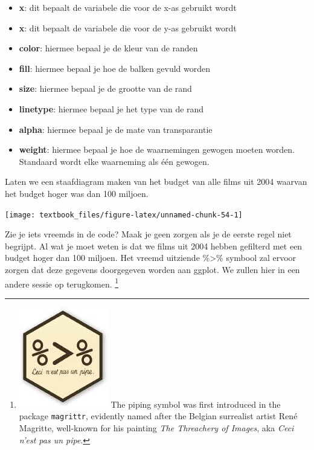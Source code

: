 \documentclass[]{tufte-book}
\newenvironment{Shaded}{}{}
\newcommand{\DecValTok}[1]{\textcolor[rgb]{0.25,0.63,0.44}{#1}}
\newcommand{\KeywordTok}[1]{\textcolor[rgb]{0.00,0.44,0.13}{\textbf{#1}}}
\newcommand{\NormalTok}[1]{#1}
\newcommand{\OperatorTok}[1]{\textcolor[rgb]{0.40,0.40,0.40}{#1}}
\newcommand{\StringTok}[1]{\textcolor[rgb]{0.25,0.44,0.63}{#1}}
\providecommand{\tightlist}{%
  \setlength{\itemsep}{0pt}\setlength{\parskip}{0pt}}
\begin{document}
\begin{itemize}
\tightlist
\item
  \textbf{x}: dit bepaalt de variabele die voor de x-as gebruikt wordt
\item
  \textbf{x}: dit bepaalt de variabele die voor de y-as gebruikt wordt
\item
  \textbf{color}: hiermee bepaal je de kleur van de randen
\item
  \textbf{fill}: hiermee bepaal je hoe de balken gevuld worden
\item
  \textbf{size}: hiermee bepaal je de grootte van de rand
\item
  \textbf{linetype}: hiermee bepaal je het type van de rand
\item
  \textbf{alpha}: hiermee bepaal je de mate van transparantie
\item
  \textbf{weight}: hiermee bepaal je hoe de waarnemingen gewogen moeten worden. Standaard wordt elke waarneming als één gewogen.
\end{itemize}

Laten we een staafdiagram maken van het budget van alle films uit 2004 waarvan het budget hoger was dan 100 miljoen.

\begin{Shaded}
\end{Shaded}

\texttt{[image: textbook\_files/figure-latex/unnamed-chunk-54-1]}

Zie je iets vreemds in de code? Maak je geen zorgen als je de eerste regel niet begrijpt. Al wat je moet weten is dat we films uit 2004 hebben gefilterd met een budget hoger dan 100 miljoen. Het vreemd uitziende \%\textgreater\% symbool zal ervoor zorgen dat deze gegevens doorgegeven worden aan ggplot. We zullen hier in een andere sessie op terugkomen. \footnote{\includegraphics{images/pipe.jpg} The piping symbol was first introduced in the package \texttt{magrittr}, evidently named after the Belgian surrealist artist René Magritte, well-known for his painting \emph{The Threachery of Images}, aka \emph{Ceci n'est pas un pipe}.}
\end{document}
